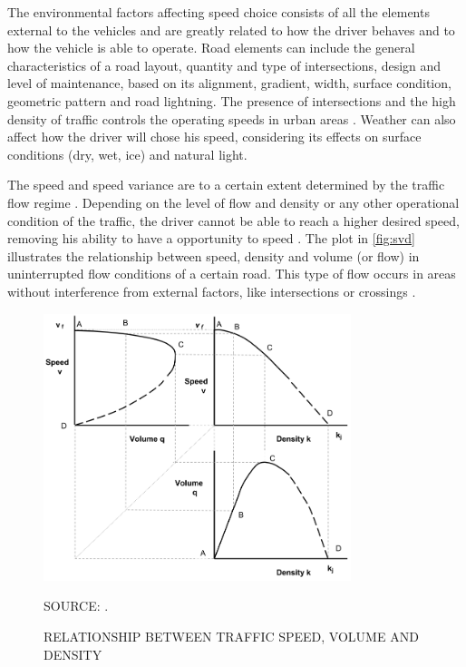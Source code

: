 The environmental factors affecting speed choice consists of all the elements external to the vehicles and are greatly related to how the driver behaves and to how the vehicle is able to operate. Road elements can include the general characteristics of a road layout, quantity and type of intersections, design and level of maintenance, based on its alignment, gradient, width, surface condition, geometric pattern and road lightning. The presence of intersections and the high density of traffic controls the operating speeds in urban areas \cite{Mohan2016a}. Weather can also affect how the driver will chose his speed, considering its effects on surface conditions (dry, wet, ice) and natural light.  

The speed and speed variance are to a certain extent determined by the traffic flow regime \cite{Shinar2017}. Depending on the level of flow and density or any other operational condition of the traffic, the driver cannot be able to reach a higher desired speed, removing his ability to have a opportunity to speed \cite{Richard2013a, Bastos2021}. The plot in \autoref{fig:svd} illustrates the relationship between speed, density and volume (or flow) in uninterrupted flow conditions of a certain road. This type of flow occurs in areas without interference from external factors, like intersections or crossings \cite{Green2020}. 

\begin{figure}[!htbp]
    \centering\footnotesize
    \captionsetup{font=footnotesize}
    \caption{RELATIONSHIP BETWEEN TRAFFIC SPEED, VOLUME AND DENSITY}
    \includegraphics[width=0.8\textwidth]{fig/svd.png}
    \label{fig:svd}
    \par SOURCE: \textcite{Green2020}.
\end{figure}

